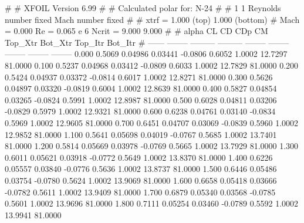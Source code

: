 #  
#       XFOIL         Version 6.99
#  
# Calculated polar for: N-24                                            
#  
# 1 1 Reynolds number fixed          Mach number fixed         
#  
# xtrf =   1.000 (top)        1.000 (bottom)  
# Mach =   0.000     Re =     0.065 e 6     Ncrit =   9.000  9.000
#  
#   alpha    CL        CD       CDp       CM     Top_Xtr  Bot_Xtr  Top_Itr  Bot_Itr
#  ------ -------- --------- --------- -------- -------- -------- -------- --------
   0.000   0.5069   0.04986   0.03441  -0.0806   0.6052   1.0002  12.7297  81.0000
   0.100   0.5237   0.04968   0.03412  -0.0809   0.6033   1.0002  12.7829  81.0000
   0.200   0.5424   0.04937   0.03372  -0.0814   0.6017   1.0002  12.8271  81.0000
   0.300   0.5626   0.04897   0.03320  -0.0819   0.6004   1.0002  12.8639  81.0000
   0.400   0.5827   0.04854   0.03265  -0.0824   0.5991   1.0002  12.8987  81.0000
   0.500   0.6028   0.04811   0.03206  -0.0829   0.5979   1.0002  12.9321  81.0000
   0.600   0.6238   0.04761   0.03140  -0.0834   0.5969   1.0002  12.9605  81.0000
   0.700   0.6451   0.04707   0.03069  -0.0839   0.5960   1.0002  12.9852  81.0000
   1.100   0.5641   0.05698   0.04019  -0.0767   0.5685   1.0002  13.7401  81.0000
   1.200   0.5814   0.05669   0.03978  -0.0769   0.5665   1.0002  13.7929  81.0000
   1.300   0.6011   0.05621   0.03918  -0.0772   0.5649   1.0002  13.8370  81.0000
   1.400   0.6226   0.05557   0.03840  -0.0776   0.5636   1.0002  13.8737  81.0000
   1.500   0.6446   0.05486   0.03754  -0.0780   0.5624   1.0002  13.9069  81.0000
   1.600   0.6658   0.05418   0.03666  -0.0782   0.5611   1.0002  13.9409  81.0000
   1.700   0.6879   0.05340   0.03568  -0.0785   0.5601   1.0002  13.9696  81.0000
   1.800   0.7111   0.05254   0.03460  -0.0789   0.5592   1.0002  13.9941  81.0000
